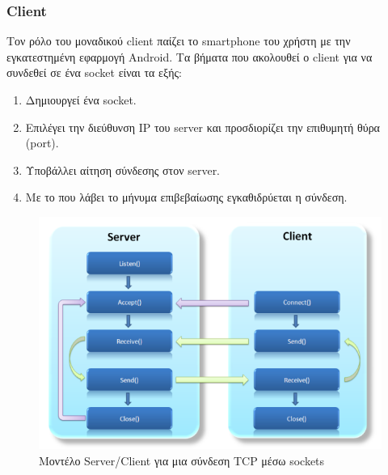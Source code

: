 \subsubsection{Client}
Τον ρόλο του μοναδικού client παίζει το smartphone του χρήστη με την εγκατεστημένη εφαρμογή Android. Τα βήματα που ακολουθεί ο client για να συνδεθεί σε ένα socket είναι τα εξής:
\begin{enumerate}
    \item Δημιουργεί ένα socket.
    \item Επιλέγει την διεύθυνση IP του server και προσδιορίζει την επιθυμητή θύρα (port).
    \item Υποβάλλει αίτηση σύνδεσης στον server.  
    \item Με το που λάβει το μήνυμα επιβεβαίωσης εγκαθιδρύεται η σύνδεση.
\end{enumerate}

\begin{figure}[H]
    \centering
    \includegraphics[width=\textwidth]{images/socket_client_server.png}
    \caption{Μοντέλο Server/Client για μια σύνδεση TCP μέσω sockets}
    \label{fig:client-server}
\end{figure}
